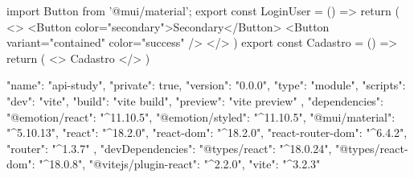 import { Button } from '@mui/material';
export const LoginUser = () => {
    return (
        <>
            <Button color="secondary">Secondary</Button>
            <Button variant="contained" color="success" />
        </>
    )
}
export const Cadastro = () => {
    return (
        <>
            Cadastro
        </>
    )
}


{
  "name": "api-study",
  "private": true,
  "version": "0.0.0",
  "type": "module",
  "scripts": {
    "dev": "vite",
    "build": "vite build",
    "preview": "vite preview"
  },
  "dependencies": {
    "@emotion/react": "^11.10.5",
    "@emotion/styled": "^11.10.5",
    "@mui/material": "^5.10.13",
    "react": "^18.2.0",
    "react-dom": "^18.2.0",
    "react-router-dom": "^6.4.2",
    "router": "^1.3.7"
  },
  "devDependencies": {
    "@types/react": "^18.0.24",
    "@types/react-dom": "^18.0.8",
    "@vitejs/plugin-react": "^2.2.0",
    "vite": "^3.2.3"
  }
}
